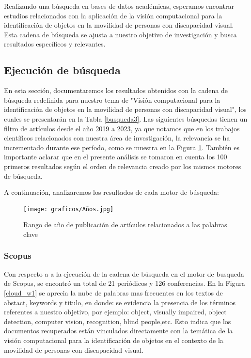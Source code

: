 \documentclass[letterpaper]{article}
\begin{document}
Realizando una búsqueda en bases de datos académicas, esperamos encontrar estudios relacionados con la aplicación de la visión computacional para la identificación de objetos en la movilidad de personas con discapacidad visual. Esta cadena de búsqueda se ajusta a nuestro objetivo de investigación y busca resultados específicos y relevantes.

    
    
	\subsection{Ejecución de búsqueda}
	En esta sección, documentaremos los resultados obtenidos con la cadena de búsqueda redefinida para nuestro tema de "Visión computacional para la identificación de objetos en la movilidad de personas con discapacidad visual", los cuales se presentarán en la Tabla \ref{busqueda3}. Las siguientes búsquedas tienen un filtro de artículos desde el año 2019 a 2023, ya que notamos que en los trabajos científicos relacionados con nuestra área de investigación, la relevancia se ha incrementado durante ese período, como se muestra en la Figura \ref{años}. También es importante aclarar que en el presente análisis se tomaron en cuenta los 100 primeros resultados según el orden de relevancia creado por los mismos motores de búsqueda.

A continuación, analizaremos los resultados de cada motor de búsqueda:
	\begin{figure}[hbtp]
    		\centering
    		\texttt{[image: graficos/Años.jpg]}
    		\caption{Rango de año de publicación de artículos relacionados a las palabras clave}
    		\label{años}
    \end{figure}
	\subsubsection{Scopus}
    Con respecto a a la ejecución de la cadena de búsqueda en el motor de busqueda de Scopus, se encontró un total de 21 periódicos y 126 conferencias.
En la Figura \ref{cloud_w1} se aprecia la nube de palabras mas frecuentes en los textos de abstact, keywords y titulo, en donde: se evidencia la presencia de los términos referentes a nuestro objetivo, por ejemplo: object, visually impaired, object detection, computer vision, recognition, blind people,etc. 
Esto indica que los documentos recuperados están vinculados directamente con la temática de la visión computacional para la identificación de objetos en el contexto de la movilidad de personas con discapacidad visual.
\end{document}
